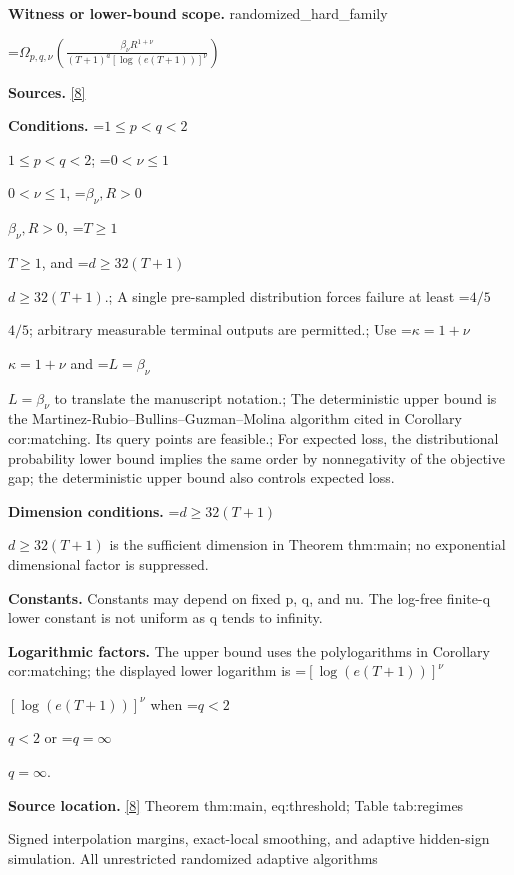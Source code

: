 \documentclass[10pt,a4paper]{article}
\newcommand{\AtlasMath}[1]{\par\begingroup\centering\setbox0=\hbox{$\displaystyle #1$}\ifdim\wd0>1.4\linewidth\typeout{ATLAS WIDE FORMULA: \the\wd0}\fi\ifdim\wd0>\linewidth\resizebox{\linewidth}{!}{\box0}\else\box0\fi\par\endgroup}
\newcommand{\AtlasInlineMath}[1]{\begingroup\setbox0=\hbox{$#1$}\ifdim\wd0>.4\linewidth\endgroup\AtlasMath{#1}\else\endgroup$#1$\fi}
\begin{document}
\textbf{Witness or lower-bound scope.} randomized\_hard\_family



\AtlasMath{\Omega_{p,q,\nu}\!\left(\frac{\beta_\nu R^{1+\nu}}{(T+1)^a[\log(e(T+1))]^\nu}\right)}


\textbf{Sources.} \href{https://github.com/WU-Wendao/Colombo/blob/main/colombo_sensorium/Complexity_altas/data/sources/colombo/B1/manuscript.pdf}{[8]}



\textbf{Conditions.} \AtlasInlineMath{1\le p<q<2}; \AtlasInlineMath{0<\nu\le1}, \AtlasInlineMath{\beta_\nu,R>0}, \AtlasInlineMath{T\ge1}, and \AtlasInlineMath{d\ge32(T+1)}.; A single pre-sampled distribution forces failure at least \AtlasInlineMath{4/5}; arbitrary measurable terminal outputs are permitted.; Use \AtlasInlineMath{\kappa=1+\nu} and \AtlasInlineMath{L=\beta_\nu} to translate the manuscript notation.; The deterministic upper bound is the Martinez-Rubio--Bullins--Guzman--Molina algorithm cited in Corollary cor:matching. Its query points are feasible.; For expected loss, the distributional probability lower bound implies the same order by nonnegativity of the objective gap; the deterministic upper bound also controls expected loss.



\textbf{Dimension conditions.} \AtlasInlineMath{d\ge32(T+1)} is the sufficient dimension in Theorem thm:main; no exponential dimensional factor is suppressed.



\textbf{Constants.} Constants may depend on fixed p, q, and nu. The log-free finite-q lower constant is not uniform as q tends to infinity.



\textbf{Logarithmic factors.} The upper bound uses the polylogarithms in Corollary cor:matching; the displayed lower logarithm is \AtlasInlineMath{[\log(e(T+1))]^\nu} when \AtlasInlineMath{q<2} or \AtlasInlineMath{q=\infty}.



\textbf{Source location.} \href{https://github.com/WU-Wendao/Colombo/blob/main/colombo_sensorium/Complexity_altas/data/sources/colombo/B1/manuscript.pdf}{[8]} Theorem thm:main, eq:threshold; Table tab:regimes



Signed interpolation margins, exact-local smoothing, and adaptive hidden-sign simulation. All unrestricted randomized adaptive algorithms
\end{document}
